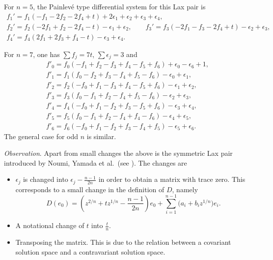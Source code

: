 \documentclass[10pt,a4paper]{amsart}
\numberwithin{equation}{section}
\begin{document}
For $n=5$, the Painlev\'e type differential system for this Lax pair is %
 \begin{gather*}
 f_1'=f_1(-f_1-2f_2-2f_4+t)+2\epsilon_1+\epsilon_2+\epsilon_3+\epsilon_4,\\
f_2'=f_2(-2f_1+f_2-2f_4-t)-\epsilon_1+\epsilon_2,\qquad
 f_3'=f_3(-2f_1-f_3-2f_4+t)-\epsilon_2+\epsilon_3,\\
 f_4'=f_4(2f_1+2f_3+f_4-t)-\epsilon_3+\epsilon_4.\end{gather*}

For $n=7$, one has $ \sum f_j=7t$, $ \sum \epsilon_j=3$ and
 \begin{gather*}
 f'_0 = f_0(-f_1+f_2-f_3+f_4-f_5+f_6)+ \epsilon_0 - \epsilon_6 + 1,\\
f'_1 =f_1(f_0-f_2+f_3-f_4+f_5-f_6) - \epsilon_0 + \epsilon_1,\\
f'_2 =f_2( -f_0+f_1 -f_3+f_4-f_5+f_6)- \epsilon_1 + \epsilon_2,\\
f'_3 = f_3(f_0-f_1+f_2-f_4+f_5-f_6) - \epsilon_2 + \epsilon_3,\\
f'_4 =f_4(-f_0+f_1-f_2+f_3-f_5+f_6) - \epsilon_3 + \epsilon_4,\\
f'_5 = f_5(f_0-f_1+f_2-f_4+f_4-f_6) - \epsilon_4 + \epsilon_5,\\
f'_6 =f_6(-f_0+f_1-f_2+f_3-f_4+f_5) - \epsilon_5 + \epsilon_6.\end{gather*}
The general case for odd $n$ is similar.

 {\it Observation}. Apart from small changes the above is the symmetric Lax pair
 introduced by Noumi, Yamada et al.\ (see \cite{N-Y,S-H-C}). The changes are
 \begin{itemize}\itemsep=0pt
\item[(a)] $\epsilon_j$ is changed into $\epsilon_j-\frac{n-1}{2n}$ in order to obtain a matrix with trace zero. This corresponds to a small change in the definition of $D$, namely
 \[D(e_0)=\left(z^{2/n}+tz^{1/n}-\frac{n-1}{2n}\right) e_0+\sum _{i=1}^{n-1}\bigl(a_i+b_iz^{1/n}\bigr) e_i.\]
\item[(b)] A notational change of $t$ into $\frac{t}{n}$.

\item[(c)] Transposing the matrix. This is due to the relation between a covariant solution space and a contravariant solution space.
\end{itemize}
\end{document}
